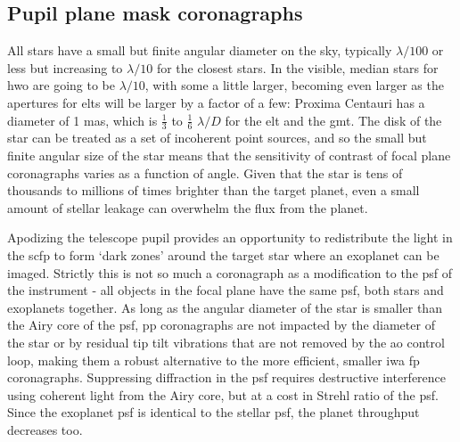 \documentclass[letterpaper]{ar-1col}
\newcommand{\ld}{$\lambda/D$}
\newcommand{\acc}[1]{\entry{\acs{#1}}{\acl{#1}}}
\begin{document}
\subsection{Pupil plane mask coronagraphs}

All stars have a small but finite angular diameter on the sky, typically $\lambda/100$ or less but increasing to $\lambda/10$ for the closest stars.
In the visible, median stars for \ac{hwo} are going to be $\lambda/10$, with some a little larger, becoming even larger as the apertures for \acp{elt} will be larger by a factor of a few: Proxima Centauri has a diameter of 1 mas, which is $\frac{1}{3}$ to $\frac{1}{6}$ \ld{} for the \ac{elt} and the \ac{gmt}.
%
The disk of the star can be treated as a set of incoherent point sources, and so the small but finite angular size of the star means that the sensitivity of contrast of focal plane coronagraphs varies as a function of angle.
%
Given that the star is tens of thousands to millions of times brighter than the target planet, even a small amount of stellar leakage can overwhelm the flux from the planet.


\begin{armarginnote}[]
\acc{sp}
\acc{app}
\acc{gvapp}
\acc{vvc}
\end{armarginnote}


Apodizing the telescope pupil provides an opportunity to redistribute the light in the \ac{scfp} to form `dark zones' around the target star where an exoplanet can be imaged.
%
Strictly this is not so much a coronagraph as a modification to the \ac{psf} of the instrument - all objects in the focal plane have the same \ac{psf}, both stars and exoplanets together.
%
As long as the angular diameter of the star is smaller than the Airy core of the \ac{psf}, \ac{pp} coronagraphs are not impacted by the diameter of the star or by residual tip tilt vibrations that are not removed by the \ac{ao} control loop, making them a robust alternative to the more efficient, smaller \ac{iwa} \ac{fp} coronagraphs. 
%
Suppressing diffraction in the \ac{psf} requires destructive interference using coherent light from the Airy core, but at a cost in Strehl ratio of the \ac{psf}.
%
Since the exoplanet \ac{psf} is identical to the stellar \ac{psf}, the planet throughput decreases too.
\end{document}
